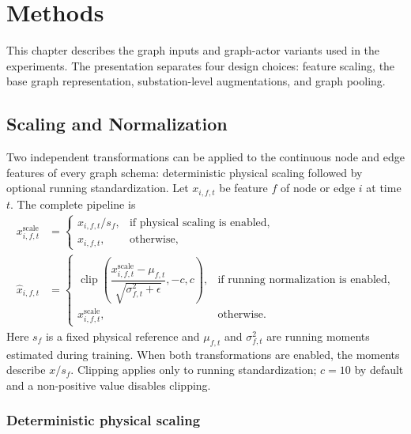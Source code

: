 \chapter{Methods}
\label{ch:methods}


This chapter describes the graph inputs and graph-actor variants used in the
experiments. The presentation separates four design choices: feature scaling,
the base graph representation, substation-level augmentations, and graph
pooling.

\section{Scaling and Normalization}
\label{subsec:graph-feature-normalization}

Two independent transformations can be applied to the continuous node and edge
features of every graph schema: deterministic physical scaling followed by
optional running standardization. Let $x_{i,f,t}$ be feature $f$ of node or edge
$i$ at time $t$. The complete pipeline is
\begin{align}
  x^{\mathrm{scale}}_{i,f,t}
  &=
  \begin{cases}
    x_{i,f,t}/s_f, & \text{if physical scaling is enabled},\\
    x_{i,f,t}, & \text{otherwise},
  \end{cases}
  \label{eq:graph-physical-scaling}\\
  \widehat{x}_{i,f,t}
  &=
  \begin{cases}
    \operatorname{clip}\!\left(
      \dfrac{x^{\mathrm{scale}}_{i,f,t}-\mu_{f,t}}
            {\sqrt{\sigma_{f,t}^{2}+\epsilon}},
      -c,c
    \right), & \text{if running normalization is enabled},\\
    x^{\mathrm{scale}}_{i,f,t}, & \text{otherwise}.
  \end{cases}
  \label{eq:graph-feature-normalization}
\end{align}
Here $s_f$ is a fixed physical reference and $\mu_{f,t}$ and
$\sigma_{f,t}^{2}$ are running moments estimated during training. When both
transformations are enabled, the moments describe $x/s_f$. Clipping applies
only to running standardization; $c=10$ by default and a non-positive value
disables clipping.

\subsection{Deterministic physical scaling}

